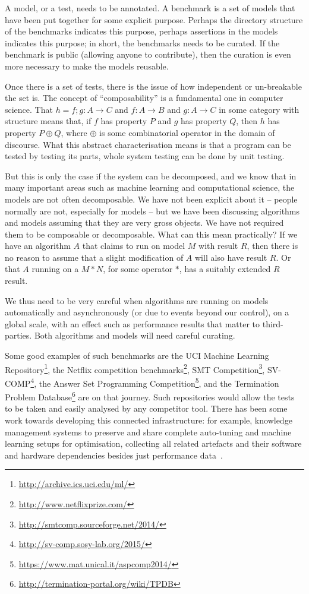 \documentclass[conference]{IEEEtran}
\begin{document}
A model, or a test, needs to be annotated. A benchmark is a set of
models that have been put together for some explicit purpose. Perhaps
the directory structure of the benchmarks indicates this purpose,
perhaps assertions in the models indicates this purpose; in short, the
benchmarks needs to be curated. If the benchmark is public (allowing
anyone to contribute), then the curation is even more necessary to
make the models reusable.

Once there is a set of tests, there is the issue of how independent or
un-breakable the set is.  The concept of ``composability'' is a 
fundamental one in computer science.  That $h = f; g : A \rightarrow C$
and $f : A \rightarrow B$ and $g : A \rightarrow C$ in some category
with structure means that, if $f$ has property $P$ and $g$ has
property $Q$, then $h$ has property $P \oplus Q$, where $\oplus$ is
some combinatorial operator in the domain of discourse. What this
abstract characterisation means is that a program can be tested by
testing its parts, whole system testing can be done by unit testing.

But this is only the case if the system can be decomposed, and we know
that in many important areas such as machine learning and computational
science, the models are not often decomposable.  We have not
been explicit about it -- people normally are not, especially for
models -- but we have been discussing algorithms and models assuming
that they are very gross objects. We have not required them to be
composable or decomposable. What can this mean practically? If we
have an algorithm $A$ that claims to run on model $M$ with result $R$,
then there is no reason to assume that a slight modification of $A$
will also have result $R$. Or that $A$ running on a $M * N$, for some
operator $*$, has a suitably extended $R$ result.

We thus need to be very careful when algorithms are running on models
automatically and asynchronously (or due to events beyond our
control), on a global scale, with an effect such as performance
results that matter to third-parties. Both algorithms and models will
need careful curating.

Some good examples of such benchmarks are the UCI Machine Learning
Repository\footnote{\url{http://archive.ics.uci.edu/ml/}}, the Netflix
competition benchmarks\footnote{\url{http://www.netflixprize.com/}},
SMT Competition\footnote{\url{http://smtcomp.sourceforge.net/2014/}},
SV-COMP\footnote{\url{http://sv-comp.sosy-lab.org/2015/}}, the Answer
Set Programming
Competition\footnote{\url{https://www.mat.unical.it/aspcomp2014/}},
and the Termination Problem
Database\footnote{\url{http://termination-portal.org/wiki/TPDB}} are
on that journey. Such repositories would allow the tests to be taken
and easily analysed by any competitor tool. There has been some work
towards developing this connected infrastructure: for example,
knowledge management systems to preserve and share complete
auto-tuning and machine learning setups for optimisation, collecting
all related artefacts and their software and hardware dependencies
besides just performance data~\cite{fursin-et-al:2014}.
\end{document}

